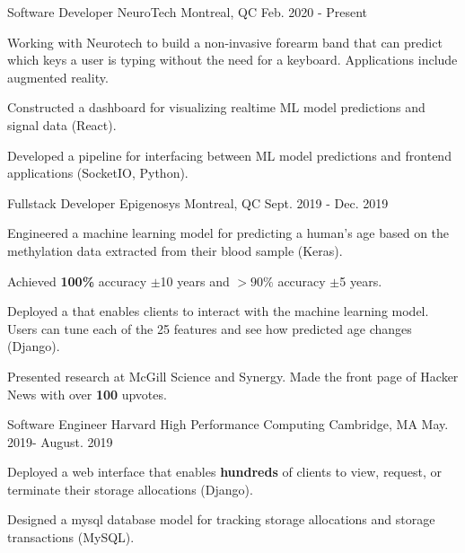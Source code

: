 \begin{cventries}
  \cventry
    {Software Developer} %
    {NeuroTech} %
    {Montreal, QC} %
    {Feb. 2020 - Present} %
    {
      \begin{cvitems} %
      \item {Working with Neurotech to build a non-invasive forearm band that can predict which keys a user is typing without the need for a keyboard. Applications include augmented reality.}
      \item {Constructed a dashboard for visualizing realtime ML model predictions and signal data (React).}
      \item {Developed a pipeline for interfacing between ML model predictions and frontend applications (SocketIO, Python).}
      \end{cvitems}
    }

  \cventry
    {Fullstack Developer} %
    {Epigenosys} %
    {Montreal, QC} %
    {Sept. 2019 - Dec. 2019} %
    {
      \begin{cvitems} %
      \item {Engineered a machine learning model for predicting a human's age based on the methylation data extracted from their blood sample (Keras).}
      \item {Achieved \textbf{100\%} accuracy $\pm$10 years and $>90\%$ accuracy $\pm$5 years.}
      \item {Deployed a  that enables clients to interact with the machine learning model. Users can tune each of the 25 features and see how predicted age changes (Django).}
      \item {Presented research at McGill Science and Synergy. Made the front page of Hacker News with over \textbf{100} upvotes.}
      \end{cvitems}
    }

  \cventry
    {Software Engineer} %
    {Harvard High Performance Computing} %
    {Cambridge, MA} %
    {May. 2019- August. 2019} %
    {
      \begin{cvitems} %
      \item {Deployed a web interface that enables \textbf{hundreds} of clients to view, request, or terminate their storage allocations (Django).}
      \item {Designed a mysql database model for tracking storage allocations and storage transactions (MySQL).}
      \end{cvitems}
    }


\end{cventries}
